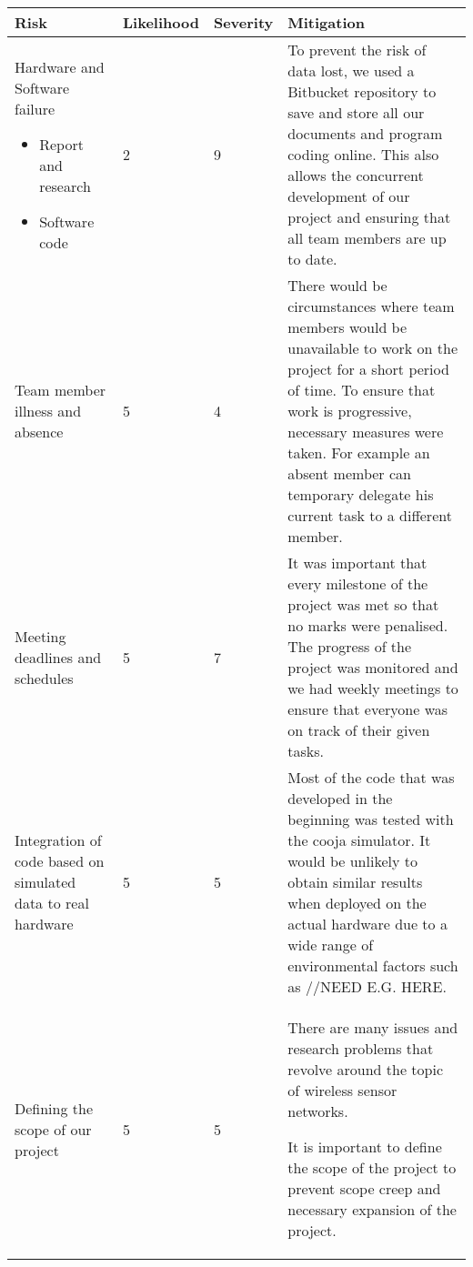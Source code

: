 \begin{center}
	\begin{longtable}{| p{4cm} | l | l | p{7cm} |}
	\hline
	Risk & Likelihood & Severity & Mitigation\\
	\hline	
	
	Hardware and Software failure
	\begin{itemize}
		\item Report and research
		\item Software code
	\end{itemize}
	 & 2 & 9 & To prevent the risk of data lost, we used a Bitbucket repository to save and store all our documents and program coding online. This also allows the concurrent development of our project and ensuring that all team members are up to date.
	 
	\\ \hline
	
	Team member illness and absence
	& 5 & 4 & There would be circumstances where team members would be unavailable to work on the project for a short period of time. To ensure that work is progressive, necessary measures were taken. For example an absent member can temporary delegate his current task to a different member.
	
	\\ \hline
		
	Meeting deadlines and schedules
	& 5 & 7 & It was important that every milestone of the project was met so that no marks were penalised. The progress of the project was monitored and we had weekly meetings to ensure that everyone was on track of their given tasks.
	
	\\ \hline
	
	Integration of code based on simulated data to real hardware
	& 5 & 5 & Most of the code that was developed in the beginning was tested with the cooja simulator. It would be unlikely to obtain similar results when deployed on the actual hardware due to a wide range of environmental factors such as //NEED E.G. HERE.
	
		\\ \hline
		
	Defining the scope of our project
	& 5 & 5 & There are many issues and research problems that revolve around the topic of wireless sensor networks.

It is important to define the scope of the project to prevent scope creep and necessary expansion of the project.


\end{longtable}
\end{center}
